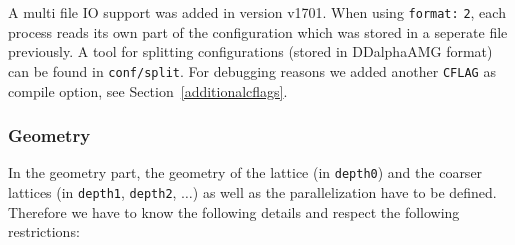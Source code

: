 \documentclass[a4paper,12pt]{scrartcl}
\begin{document}
A multi file IO support was added in version v1701. When using \texttt{format:} \texttt{2}, each process reads its own part of the configuration which was stored in a seperate file previously. A tool for splitting configurations (stored in DDalphaAMG format) can be found in \texttt{conf/split}. For debugging reasons we added another \texttt{CFLAG} as compile option, see Section~\ref{additionalcflags}.

\subsubsection{Geometry}
In the geometry part, the geometry of the lattice (in \texttt{depth0}) and the coarser lattices (in \texttt{depth1}, \texttt{depth2}, $\ldots$) as well as the parallelization have to be defined. Therefore we have to know the following details and respect the following restrictions:
\end{document}
